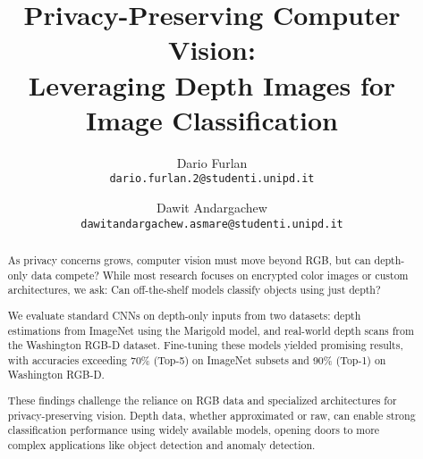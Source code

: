 \documentclass[10pt,twocolumn,letterpaper]{article}
\begin{document}
\title{Privacy-Preserving Computer Vision:\\ Leveraging Depth Images for Image Classification}

\author{Dario Furlan \\
{\tt\small dario.furlan.2@studenti.unipd.it}
\and
Dawit Andargachew\\
{\tt\small  dawitandargachew.asmare@studenti.unipd.it}
}

\maketitle

\begin{abstract}
As privacy concerns grows, computer vision must move beyond RGB, but can depth-only data compete? While most research focuses on encrypted color images or custom architectures, we ask: Can off-the-shelf models classify objects using just depth?

We evaluate standard CNNs on depth-only inputs from two datasets: depth estimations from ImageNet using the Marigold model, and real-world depth scans from the Washington RGB-D dataset. Fine-tuning these models yielded promising results, with accuracies exceeding 70\% (Top-5) on ImageNet subsets and 90\% (Top-1) on Washington RGB-D.

These findings challenge the reliance on RGB data and specialized architectures for privacy-preserving vision. Depth data, whether approximated or raw, can enable strong classification performance using widely available models, opening doors to more complex applications like object detection and anomaly detection.

\end{abstract}








{\small


}
\end{document}
